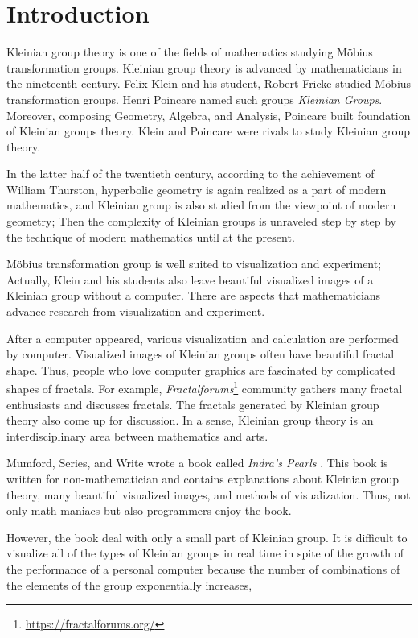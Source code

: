
\section{Introduction}

Kleinian group theory is one of the fields of mathematics studying 
M\"obius transformation groups.
Kleinian group theory is advanced by mathematicians in the nineteenth
century.
Felix Klein and his student, Robert Fricke studied M\"obius
transformation groups.
Henri Poincare named such groups \textit{Kleinian Groups}.
Moreover, composing Geometry, Algebra, and Analysis,
Poincare built foundation of Kleinian groups theory.
Klein and Poincare were rivals to study Kleinian group theory.

In the latter half of the twentieth century, according to the
achievement of William Thurston, hyperbolic geometry is again realized 
as a part of modern mathematics, and Kleinian group is also studied from
the viewpoint of modern geometry;
Then the complexity of Kleinian groups is unraveled step by step by
the technique of modern mathematics until at the present.

M\"obius transformation group is well suited to visualization and
experiment; Actually, Klein and his students also leave beautiful
visualized images of a Kleinian group without a computer.
There are aspects that mathematicians advance research from
visualization and experiment.

After a computer appeared, various visualization and calculation are
performed by computer.
Visualized images of Kleinian groups often have beautiful fractal shape.
Thus, people who love computer graphics are fascinated by complicated shapes of fractals.
For example,
\textit{Fractalforums}\footnote{\url{https://fractalforums.org/}}
community gathers many fractal enthusiasts and discusses fractals.
The fractals generated by Kleinian group theory also come up for
discussion.
In a sense, Kleinian group theory is an interdisciplinary area between
mathematics and arts.

Mumford, Series, and Write wrote a book called
\textit{Indra's Pearls} \cite{MumfordSeriesWright200204}.
This book is written for non-mathematician and contains explanations
about Kleinian group theory, many beautiful visualized images, and
methods of visualization.
Thus, not only math maniacs but also programmers enjoy the book.

However, the book deal with only a small part of Kleinian group.
It is difficult to visualize all of the types of Kleinian groups in real
time in spite of the growth of the performance of a personal computer
because the number of combinations of the elements of the group
exponentially increases,

